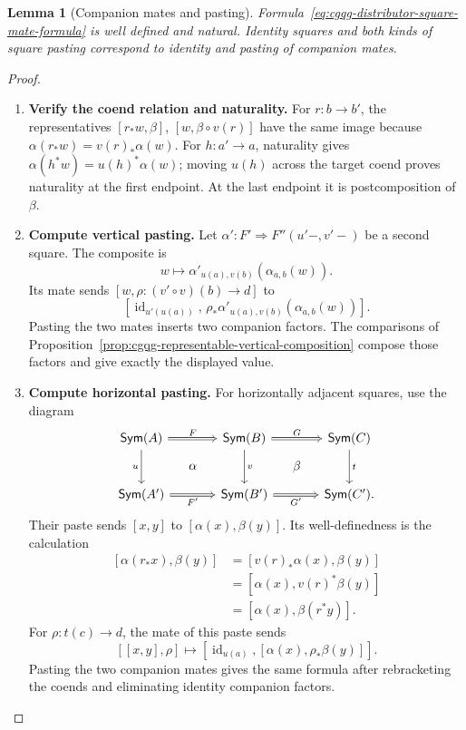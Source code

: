 \documentclass[oneside]{article}
\newcommand{\Sym}{\mathsf{Sym}}
\newcommand{\id}{\operatorname{id}}
\theoremstyle{plain}
\newtheorem{lemma}[theorem]{Lemma}
\theoremstyle{definition}
\theoremstyle{remark}
\begin{document}
\begin{lemma}[Companion mates and pasting]
\label{lem:cgqg-companion-mate-calculus}
Formula~\eqref{eq:cgqg-distributor-square-mate-formula} is well defined
and natural. Identity squares and both kinds of square pasting correspond
to identity and pasting of companion mates.
\end{lemma}
\begin{proof}
    \leavevmode
    \begin{enumerate}[beginpenalty=10000]
        \item \textbf{Verify the coend relation and naturality.}
        For \(r:b\to b'\), the representatives
        \([r_*w,\beta]\), \([w,\beta\circ v(r)]\) have the same image because
        \(\alpha(r_*w)=v(r)_*\alpha(w)\).
        For \(h:a'\to a\), naturality gives
        \(\alpha(h^*w)=u(h)^*\alpha(w)\); moving \(u(h)\)
        across the target coend proves naturality at the first endpoint.
        At the last endpoint it is postcomposition of \(\beta\).

        \item \textbf{Compute vertical pasting.}
        Let \(\alpha':F'\Rightarrow F''(u'-,v'-)\) be a second square.
        The composite is
        \[
        w\longmapsto\alpha'_{u(a),v(b)}(\alpha_{a,b}(w)).
        \]
        Its mate sends \([w,\rho:(v'\circ v)(b)\to d]\) to
        \[
        [\id_{u'(u(a))},\,\rho_*\alpha'_{u(a),v(b)}(\alpha_{a,b}(w))].
        \]
        Pasting the two mates inserts two companion factors.
        The comparisons of
        Proposition~\ref{prop:cgqg-representable-vertical-composition}
        compose those factors and give exactly the displayed value.

        \item \textbf{Compute horizontal pasting.}
        For horizontally adjacent squares, use the diagram
        \[
        \begin{tikzcd}[column sep=large,row sep=large]
        \Sym(A)\arrow[r,Rightarrow,"F"]\arrow[d,"u"']
          &\Sym(B)\arrow[r,Rightarrow,"G"]\arrow[d,"v"]
          &\Sym(C)\arrow[d,"t"]\\
        \Sym(A')\arrow[r,Rightarrow,"F'"']
          &\Sym(B')\arrow[r,Rightarrow,"G'"']&\Sym(C')
        \arrow[phantom,from=1-1,to=2-2,"\alpha" description]
        \arrow[phantom,from=1-2,to=2-3,"\beta" description].
        \end{tikzcd}
        \]
        Their paste sends \([x,y]\) to \([\alpha(x),\beta(y)]\).
        Its well-definedness is the calculation
        \[
        \begin{aligned}
        [\alpha(r_*x),\beta(y)]
          &=[v(r)_*\alpha(x),\beta(y)]\\
          &=[\alpha(x),v(r)^*\beta(y)]\\
          &=[\alpha(x),\beta(r^*y)].
        \end{aligned}
        \]
        For \(\rho:t(c)\to d\), the mate of this paste sends
        \[
        [[x,y],\rho]\longmapsto
          [\id_{u(a)},[\alpha(x),\rho_*\beta(y)]].
        \]
        Pasting the two companion mates gives the same formula after
        rebracketing the coends and eliminating identity companion factors.


\end{enumerate}
\end{proof}
\end{document}
